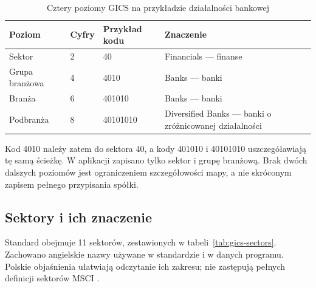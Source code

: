 \documentclass[12pt,a4paper,twoside]{report}
\begin{document}
\begin{table}[htbp]
\centering
\caption{Cztery poziomy GICS na przykładzie działalności bankowej}
\label{tab:gics-levels}
\small
\begin{tabularx}{\textwidth}{p{3.1cm}p{1.2cm}p{2.6cm}X}
\toprule
Poziom & Cyfry & Przykład kodu & Znaczenie \\
\midrule
Sektor & 2 & 40 & Financials --- finanse \\
Grupa branżowa & 4 & 4010 & Banks --- banki \\
Branża & 6 & 401010 & Banks --- banki \\
Podbranża & 8 & 40101010 & Diversified Banks --- banki o zróżnicowanej działalności \\
\bottomrule
\end{tabularx}
\end{table}

Kod 4010 należy zatem do sektora 40, a kody 401010 i 40101010 uszczegóławiają tę samą ścieżkę. W aplikacji zapisano tylko sektor i grupę branżową. Brak dwóch dalszych poziomów jest ograniczeniem szczegółowości mapy, a nie skróconym zapisem pełnego przypisania spółki.

\subsection{Sektory i ich znaczenie}

Standard obejmuje 11 sektorów, zestawionych w tabeli~\ref{tab:gics-sectors}. Zachowano angielskie nazwy używane w standardzie i w danych programu. Polskie objaśnienia ułatwiają odczytanie ich zakresu; nie zastępują pełnych definicji sektorów MSCI \cite{gicssectors}.
\end{document}
